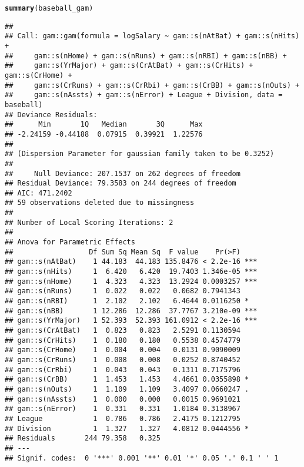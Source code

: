 \documentclass{article}\usepackage[]{graphicx}\usepackage[]{color}
\makeatletter
\newcommand{\hlstd}[1]{\textcolor[rgb]{0.345,0.345,0.345}{#1}}%
\newcommand{\hlkwd}[1]{\textcolor[rgb]{0.737,0.353,0.396}{\textbf{#1}}}%
\newenvironment{kframe}{%
 \def\at@end@of@kframe{}%
 \ifinner\ifhmode%
  \def\at@end@of@kframe{\end{minipage}}%
  \begin{minipage}{\columnwidth}%
 \fi\fi%
 \def\FrameCommand##1{\hskip\@totalleftmargin \hskip-\fboxsep
 \colorbox{shadecolor}{##1}\hskip-\fboxsep
     \hskip-\linewidth \hskip-\@totalleftmargin \hskip\columnwidth}%
 \MakeFramed {\advance\hsize-\width
   \@totalleftmargin\z@ \linewidth\hsize
   \@setminipage}}%
 {\par\unskip\endMakeFramed%
 \at@end@of@kframe}
\newenvironment{knitrout}{}{} %
\makeatother
\begin{document}
\begin{knitrout}
\begin{kframe}
\begin{alltt}
\hlkwd{summary}\hlstd{(baseball_gam)}
\end{alltt}
\begin{verbatim}
## 
## Call: gam::gam(formula = logSalary ~ gam::s(nAtBat) + gam::s(nHits) + 
##     gam::s(nHome) + gam::s(nRuns) + gam::s(nRBI) + gam::s(nBB) + 
##     gam::s(YrMajor) + gam::s(CrAtBat) + gam::s(CrHits) + gam::s(CrHome) + 
##     gam::s(CrRuns) + gam::s(CrRbi) + gam::s(CrBB) + gam::s(nOuts) + 
##     gam::s(nAssts) + gam::s(nError) + League + Division, data = baseball)
## Deviance Residuals:
##      Min       1Q   Median       3Q      Max 
## -2.24159 -0.44188  0.07915  0.39921  1.22576 
## 
## (Dispersion Parameter for gaussian family taken to be 0.3252)
## 
##     Null Deviance: 207.1537 on 262 degrees of freedom
## Residual Deviance: 79.3583 on 244 degrees of freedom
## AIC: 471.2402 
## 59 observations deleted due to missingness 
## 
## Number of Local Scoring Iterations: 2 
## 
## Anova for Parametric Effects
##                  Df Sum Sq Mean Sq  F value    Pr(>F)    
## gam::s(nAtBat)    1 44.183  44.183 135.8476 < 2.2e-16 ***
## gam::s(nHits)     1  6.420   6.420  19.7403 1.346e-05 ***
## gam::s(nHome)     1  4.323   4.323  13.2924 0.0003257 ***
## gam::s(nRuns)     1  0.022   0.022   0.0682 0.7941343    
## gam::s(nRBI)      1  2.102   2.102   6.4644 0.0116250 *  
## gam::s(nBB)       1 12.286  12.286  37.7767 3.210e-09 ***
## gam::s(YrMajor)   1 52.393  52.393 161.0912 < 2.2e-16 ***
## gam::s(CrAtBat)   1  0.823   0.823   2.5291 0.1130594    
## gam::s(CrHits)    1  0.180   0.180   0.5538 0.4574779    
## gam::s(CrHome)    1  0.004   0.004   0.0131 0.9090009    
## gam::s(CrRuns)    1  0.008   0.008   0.0252 0.8740452    
## gam::s(CrRbi)     1  0.043   0.043   0.1311 0.7175796    
## gam::s(CrBB)      1  1.453   1.453   4.4661 0.0355898 *  
## gam::s(nOuts)     1  1.109   1.109   3.4097 0.0660247 .  
## gam::s(nAssts)    1  0.000   0.000   0.0015 0.9691021    
## gam::s(nError)    1  0.331   0.331   1.0184 0.3138967    
## League            1  0.786   0.786   2.4175 0.1212795    
## Division          1  1.327   1.327   4.0812 0.0444556 *  
## Residuals       244 79.358   0.325                       
## ---
## Signif. codes:  0 '***' 0.001 '**' 0.01 '*' 0.05 '.' 0.1 ' ' 1
\end{verbatim}
\end{kframe}
\end{knitrout}
\end{document}
